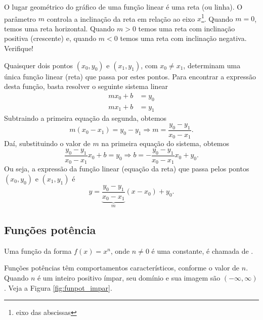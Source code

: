 \begin{obs}
  O lugar geométrico do gráfico de uma função linear é uma reta (ou linha). O parâmetro $m$ controla a inclinação da reta em relação ao eixo $x$\footnote{eixo das abscissas}. Quando $m=0$, temos uma reta horizontal. Quando $m>0$ temos uma reta com inclinação positiva (crescente) e, quando $m<0$ temos uma reta com inclinação negativa. Verifique!
\end{obs}

Quaisquer dois pontos $(x_0, y_0)$ e $(x_1, y_1)$, com $x_0\neq x_1$, determinam uma única função linear (reta) que passa por estes pontos. Para encontrar a expressão desta função, basta resolver o seguinte sistema linear
\begin{align}
  mx_0 + b &= y_0\\
  mx_1 + b &= y_1
\end{align}
Subtraindo a primeira equação da segunda, obtemos
\begin{equation}
  m(x_0-x_1) = y_0-y_1 \Rightarrow m = \frac{y_0-y_1}{x_0-x_1}.
\end{equation}
Daí, substituindo o valor de $m$ na primeira equação do sistema, obtemos
\begin{equation}
  \frac{y_0-y_1}{x_0-x_1}x_0 + b = y_0 \Rightarrow b = -\frac{y_0-y_1}{x_0-x_1}x_0 + y_0.
\end{equation}
Ou seja, a expressão da função linear (equação da reta) que passa pelos pontos $(x_0, y_0)$ e $(x_1, y_1)$ é
\begin{equation}
  y = \underbrace{\frac{y_0-y_1}{x_0-x_1}}_{m}(x-x_0) + y_0.
\end{equation}

\subsection{Funções potência}

Uma função da forma $f(x)=x^n$, onde $n\neq 0$ é uma constante, é chamada de .

Funções potências têm comportamentos característicos, conforme o valor de $n$. Quando $n$ é um inteiro positivo ímpar, seu domínio e sua imagem são $(-\infty, \infty)$. Veja a Figura \ref{fig:funpot_impar}.

